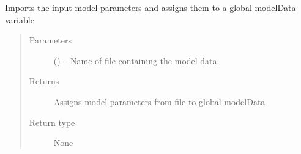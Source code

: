 \documentclass[letterpaper,10pt,english]{sphinxmanual}
\begin{document}

\begin{fulllineitems}
\label{\detokenize{MouseReferenceManual:Modules.Module_UDEC.importModelData}}
Imports the input model parameters and assigns them to a global modelData variable
\begin{quote}\begin{description}
\item[{Parameters}] \leavevmode
{} () -- Name of file containing the model data.

\item[{Returns}] \leavevmode
Assigns model parameters from file to global modelData

\item[{Return type}] \leavevmode
None

\end{description}\end{quote}

\end{fulllineitems}

\end{document}
